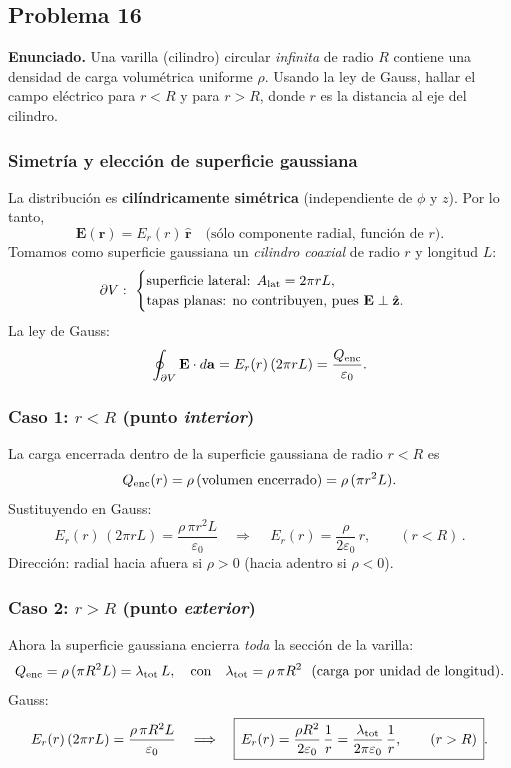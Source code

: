 \documentclass{article}
\begin{document}
\subsection{Problema 16} \vspace{0.5cm}

\textbf{Enunciado.} Una varilla (cilindro) circular \emph{infinita} de radio $R$ contiene una densidad de carga volumétrica uniforme $\rho$. Usando la ley de Gauss, hallar el campo eléctrico para $r<R$ y para $r>R$, donde $r$ es la distancia al eje del cilindro.

\subsubsection*{Simetría y elección de superficie gaussiana}
La distribución es \textbf{cilíndricamente simétrica} (independiente de $\phi$ y $z$). Por lo tanto,
\[
\mathbf E(\mathbf r)=E_r(r)\,\hat{\mathbf r}
\quad\text{(sólo componente radial, función de $r$)}.
\]
Tomamos como superficie gaussiana un \emph{cilindro coaxial} de radio $r$ y longitud $L$:
\[
\partial V:\ \begin{cases}
\text{superficie lateral: } A_{\rm lat}=2\pi r L,\\
\text{tapas planas: } \text{no contribuyen, pues } \mathbf E\perp \hat{\mathbf z}.
\end{cases}
\]
La ley de Gauss:
\[
\oint_{\partial V}\mathbf E\cdot d\mathbf a
= E_r(r)\,(2\pi r L)
=\dfrac{Q_{\rm enc}}{\varepsilon_0}.
\]

\subsubsection*{Caso 1: \texorpdfstring{$r<R$}{r<R} (punto \emph{interior})}
La carga encerrada dentro de la superficie gaussiana de radio $r<R$ es
\[
Q_{\rm enc}(r)=\rho\,(\text{volumen encerrado})=\rho\,(\pi r^2 L).
\]
Sustituyendo en Gauss:
\[
E_r(r)\,(2\pi r L)=\frac{\rho\,\pi r^2 L}{\varepsilon_0}
\quad\Longrightarrow\quad
\boxed{\,E_r(r)=\frac{\rho}{2\varepsilon_0}\,r,\qquad (r<R)\, }.
\]
Dirección: radial hacia afuera si $\rho>0$ (hacia adentro si $\rho<0$).

\subsubsection*{Caso 2: \texorpdfstring{$r>R$}{r>R} (punto \emph{exterior})}
Ahora la superficie gaussiana encierra \emph{toda} la sección de la varilla:
\[
Q_{\rm enc}=\rho\,(\pi R^2 L)=\lambda_{\rm tot}\,L,
\quad\text{con}\quad
\lambda_{\rm tot}=\rho\,\pi R^2
\ \ \text{(carga por unidad de longitud)}.
\]
Gauss:
\[
E_r(r)\,(2\pi r L)=\frac{\rho\,\pi R^2 L}{\varepsilon_0}
\quad\Longrightarrow\quad
\boxed{\,E_r(r)=\frac{\rho R^2}{2\varepsilon_0}\,\frac{1}{r}
=\frac{\lambda_{\rm tot}}{2\pi\varepsilon_0}\,\frac{1}{r},\qquad (r>R)\, }.
\]
\end{document}
